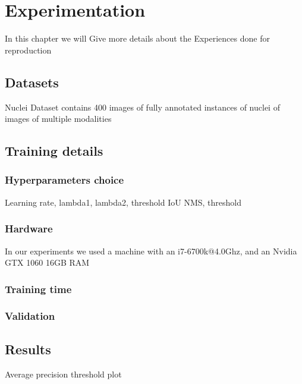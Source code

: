 \documentclass[main.tex]{subfiles}
\begin{document}
\chapter{Experimentation}
In this chapter we will Give more details about the Experiences done for reproduction
\section{Datasets}
Nuclei Dataset contains 400 images of fully annotated instances of nuclei of images of multiple modalities
\section{Training details}
\subsection{Hyperparameters choice}
Learning rate, lambda1, lambda2, threshold IoU NMS, threshold 
\subsection{Hardware}
In our experiments we used a machine with an i7-6700k@4.0Ghz, and an Nvidia GTX 1060 16GB RAM
\subsection{Training time}

\subsection{Validation}

\section{Results}
Average precision threshold plot 
\end{document}
